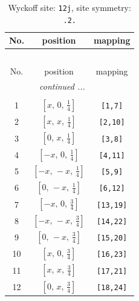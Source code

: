 \documentclass[fleqn,8pt]{jsarticle}
\begin{document}
\begin{longtable}{ccc}
\caption{Wyckoff site: {\tt 12j}, site symmetry: {\tt .2.}}
 \\
 \hline \hline
No. & position & mapping \\ \hline \endfirsthead

\multicolumn{2}{l}{\tablename\ \thetable{}} \\
 \hline \hline
No. & position & mapping \\ \hline \endhead

 \hline \hline
\multicolumn{2}{r}{\footnotesize\it continued ...} \\ \endfoot

 \hline \hline
\multicolumn{2}{r}{} \\ \endlastfoot

1 & $\left[ x,\, 0,\, \frac{1}{4} \right]$ & {\tt [1,7]} \\ \hline
2 & $\left[ x,\, x,\, \frac{1}{4} \right]$ & {\tt [2,10]} \\ \hline
3 & $\left[ 0,\, x,\, \frac{1}{4} \right]$ & {\tt [3,8]} \\ \hline
4 & $\left[ - x,\, 0,\, \frac{1}{4} \right]$ & {\tt [4,11]} \\ \hline
5 & $\left[ - x,\, - x,\, \frac{1}{4} \right]$ & {\tt [5,9]} \\ \hline
6 & $\left[ 0,\, - x,\, \frac{1}{4} \right]$ & {\tt [6,12]} \\ \hline
7 & $\left[ - x,\, 0,\, \frac{3}{4} \right]$ & {\tt [13,19]} \\ \hline
8 & $\left[ - x,\, - x,\, \frac{3}{4} \right]$ & {\tt [14,22]} \\ \hline
9 & $\left[ 0,\, - x,\, \frac{3}{4} \right]$ & {\tt [15,20]} \\ \hline
10 & $\left[ x,\, 0,\, \frac{3}{4} \right]$ & {\tt [16,23]} \\ \hline
11 & $\left[ x,\, x,\, \frac{3}{4} \right]$ & {\tt [17,21]} \\ \hline
12 & $\left[ 0,\, x,\, \frac{3}{4} \right]$ & {\tt [18,24]} \\
\end{longtable}
\renewcommand{\arraystretch}{1.2}
\end{document}

